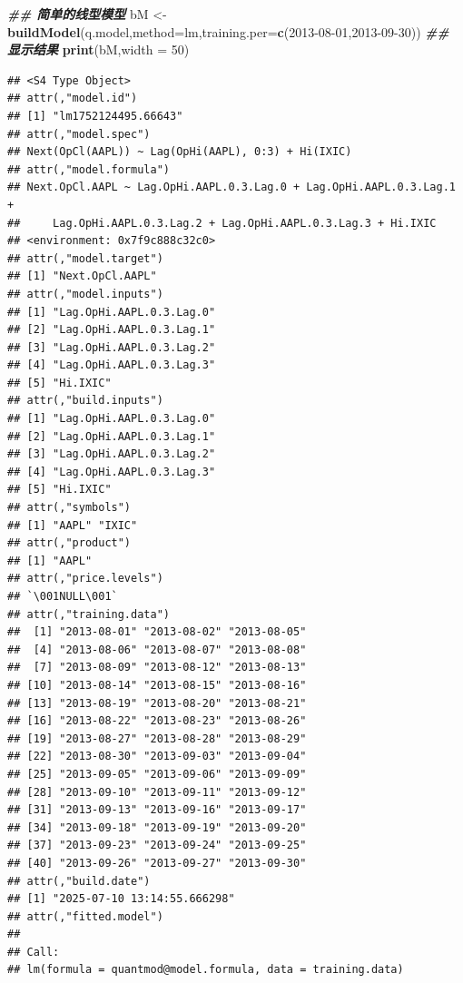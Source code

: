 \documentclass[]{ctexbook}
\newenvironment{Shaded}{\begin{snugshade}}{\end{snugshade}}
\newcommand{\AttributeTok}[1]{\textcolor[rgb]{0.13,0.29,0.53}{#1}}
\newcommand{\DecValTok}[1]{\textcolor[rgb]{0.00,0.00,0.81}{#1}}
\newcommand{\DocumentationTok}[1]{\textcolor[rgb]{0.56,0.35,0.01}{\textbf{\textit{#1}}}}
\newcommand{\FunctionTok}[1]{\textcolor[rgb]{0.13,0.29,0.53}{\textbf{#1}}}
\newcommand{\NormalTok}[1]{#1}
\newcommand{\OtherTok}[1]{\textcolor[rgb]{0.56,0.35,0.01}{#1}}
\newcommand{\StringTok}[1]{\textcolor[rgb]{0.31,0.60,0.02}{#1}}
\begin{document}
\begin{Shaded}
\begin{Highlighting}[]
\DocumentationTok{\#\# 简单的线型模型}
\NormalTok{bM }\OtherTok{\textless{}{-}} \FunctionTok{buildModel}\NormalTok{(q.model,}\AttributeTok{method=}\StringTok{\textquotesingle{}lm\textquotesingle{}}\NormalTok{,}\AttributeTok{training.per=}\FunctionTok{c}\NormalTok{(}\StringTok{\textquotesingle{}2013{-}08{-}01\textquotesingle{}}\NormalTok{,}\StringTok{\textquotesingle{}2013{-}09{-}30\textquotesingle{}}\NormalTok{))}
\DocumentationTok{\#\# 显示结果}
\FunctionTok{print}\NormalTok{(bM,}\AttributeTok{width =} \DecValTok{50}\NormalTok{)}
\end{Highlighting}
\end{Shaded}

\begin{verbatim}
## <S4 Type Object>
## attr(,"model.id")
## [1] "lm1752124495.66643"
## attr(,"model.spec")
## Next(OpCl(AAPL)) ~ Lag(OpHi(AAPL), 0:3) + Hi(IXIC)
## attr(,"model.formula")
## Next.OpCl.AAPL ~ Lag.OpHi.AAPL.0.3.Lag.0 + Lag.OpHi.AAPL.0.3.Lag.1 + 
##     Lag.OpHi.AAPL.0.3.Lag.2 + Lag.OpHi.AAPL.0.3.Lag.3 + Hi.IXIC
## <environment: 0x7f9c888c32c0>
## attr(,"model.target")
## [1] "Next.OpCl.AAPL"
## attr(,"model.inputs")
## [1] "Lag.OpHi.AAPL.0.3.Lag.0"
## [2] "Lag.OpHi.AAPL.0.3.Lag.1"
## [3] "Lag.OpHi.AAPL.0.3.Lag.2"
## [4] "Lag.OpHi.AAPL.0.3.Lag.3"
## [5] "Hi.IXIC"                
## attr(,"build.inputs")
## [1] "Lag.OpHi.AAPL.0.3.Lag.0"
## [2] "Lag.OpHi.AAPL.0.3.Lag.1"
## [3] "Lag.OpHi.AAPL.0.3.Lag.2"
## [4] "Lag.OpHi.AAPL.0.3.Lag.3"
## [5] "Hi.IXIC"                
## attr(,"symbols")
## [1] "AAPL" "IXIC"
## attr(,"product")
## [1] "AAPL"
## attr(,"price.levels")
## `\001NULL\001`
## attr(,"training.data")
##  [1] "2013-08-01" "2013-08-02" "2013-08-05"
##  [4] "2013-08-06" "2013-08-07" "2013-08-08"
##  [7] "2013-08-09" "2013-08-12" "2013-08-13"
## [10] "2013-08-14" "2013-08-15" "2013-08-16"
## [13] "2013-08-19" "2013-08-20" "2013-08-21"
## [16] "2013-08-22" "2013-08-23" "2013-08-26"
## [19] "2013-08-27" "2013-08-28" "2013-08-29"
## [22] "2013-08-30" "2013-09-03" "2013-09-04"
## [25] "2013-09-05" "2013-09-06" "2013-09-09"
## [28] "2013-09-10" "2013-09-11" "2013-09-12"
## [31] "2013-09-13" "2013-09-16" "2013-09-17"
## [34] "2013-09-18" "2013-09-19" "2013-09-20"
## [37] "2013-09-23" "2013-09-24" "2013-09-25"
## [40] "2013-09-26" "2013-09-27" "2013-09-30"
## attr(,"build.date")
## [1] "2025-07-10 13:14:55.666298"
## attr(,"fitted.model")
## 
## Call:
## lm(formula = quantmod@model.formula, data = training.data)

\end{verbatim}
\end{document}
